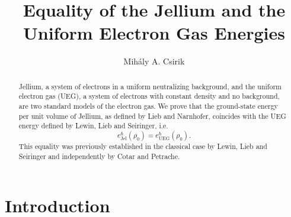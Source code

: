 \documentclass[final,reqno]{amsart}
\title[Equality of Jellium and UEG]{Equality of the Jellium and the\\Uniform Electron Gas Energies}
\author{Mih\'aly A. Csirik}
\theoremstyle{remark}
\theoremstyle{definition}
\newcommand{\UEG}{\mathrm{UEG}}
\newcommand{\Jel}{\mathrm{Jel}}
\begin{document}
\raggedbottom


\begin{abstract}
Jellium, a system of electrons in a uniform neutralizing background, and the uniform electron gas (UEG), a system of electrons with constant density and no background, are two standard models of the electron gas. We prove that the ground-state energy per unit volume of Jellium, as defined by Lieb and Narnhofer, coincides with the UEG energy defined by Lewin, Lieb and Seiringer, i.e.
\[
e^\hbar_\Jel(\rho_0)=e^\hbar_\UEG(\rho_0).
\]
This equality was previously established in the classical case by Lewin, Lieb and Seiringer and independently by Cotar and Petrache.
\end{abstract}


\maketitle



\section{Introduction}
\end{document}
